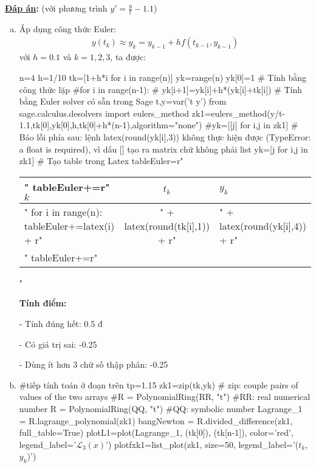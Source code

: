 \documentclass[12pt]{article}
\newcommand{\Solution}{
\medskip
{\bf \underline{Đáp án}:}
}
\begin{document}
\Solution (với phương trình $y' = \frac{y}{t}-1.1$)
\begin{enumerate}[a).]
\item Áp dụng công thức Euler:
\begin{align*}
 y(t_k) \approx y_k = y_{k-1} + h f(t_{k-1},y_{k-1})
\end{align*}
với $h=0.1$ và $k=1, 2, 3$, ta được:
\begin{sagesilent}
 n=4
 h=1/10
 tk=[1+h*i for i in range(n)]
 yk=range(n)
 yk[0]=1
 # Tính bằng công thức lặp
 #for i in range(n-1):
 #  yk[i+1]=yk[i]+h*(yk[i]+tk[i])
 # Tính bằng Euler solver có sẵn trong Sage
 t,y=var('t y')
 from sage.calculus.desolvers import eulers_method
 zk1=eulers_method(y/t-1.1,tk[0],yk[0],h,tk[0]+h*(n-1),algorithm="none")
 #yk=[[j] for i,j in zk1] # Báo lỗi phía sau: lệnh latex(round(yk[i],3)) không thực hiện được (TypeError: a float is required), vì dấu [] tạo ra matrix chứ không phải list
 yk=[j for i,j in zk1]
 # Tạo table trong Latex
 tableEuler=r"\begin{tabular}{l|c|l}"
 tableEuler+=r"$k$ & $t_k$ & $y_k$ \\ \hline"
 for i in range(n):
   tableEuler+=latex(i) + r"&" + latex(round(tk[i],1)) + r"&" + latex(round(yk[i],4)) + r"\\"
 tableEuler+=r"\end{tabular}"
\end{sagesilent}

  \begin{center}  \end{center} 

  \textbf{Tính điểm:}
  
  - Tính đúng hết: 0.5 đ
  
  - Có giá trị sai: -0.25
  
  - Dùng ít hơn 3 chữ số thập phân: -0.25
  
\item
\begin{sagesilent}
 #tiếp tính toán ở đoạn trên
 tp=1.15
 zk1=zip(tk,yk) # zip: couple pairs of values of the two arrays
 #R = PolynomialRing(RR, "t") #RR: real numerical number
 R = PolynomialRing(QQ, "t") #QQ: symbolic number
 Lagrange_1 = R.lagrange_polynomial(zk1)
 bangNewton = R.divided_difference(zk1, full_table=True)
 plotL1=plot(Lagrange_1, (tk[0]), (tk[n-1]), color='red', legend_label='$\mathcal{L}_3(x)$')
 plotfxk1=list_plot(zk1, size=50, legend_label='($t_k$,$y_k$)')


\end{sagesilent}
\end{enumerate}
\end{document}
